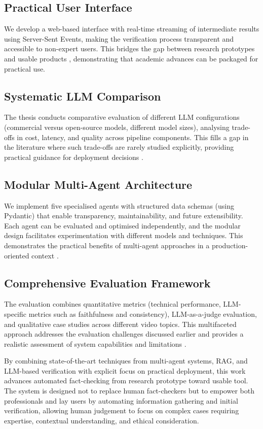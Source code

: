 \documentclass[12pt,a4paper]{article}
\begin{document}
\subsection{Practical User Interface}

We develop a web-based interface with real-time streaming of intermediate results using Server-Sent Events, making the verification process transparent and accessible to non-expert users. This bridges the gap between research prototypes and usable products \citep{lin2025factaudit}, demonstrating that academic advances can be packaged for practical use.

\subsection{Systematic LLM Comparison}

The thesis conducts comparative evaluation of different LLM configurations (commercial versus open-source models, different model sizes), analysing trade-offs in cost, latency, and quality across pipeline components. This fills a gap in the literature where such trade-offs are rarely studied explicitly, providing practical guidance for deployment decisions \citep{raschka2025llmeval}.

\subsection{Modular Multi-Agent Architecture}

We implement five specialised agents with structured data schemas (using Pydantic) that enable transparency, maintainability, and future extensibility. Each agent can be evaluated and optimised independently, and the modular design facilitates experimentation with different models and techniques. This demonstrates the practical benefits of multi-agent approaches in a production-oriented context \citep{hysonlab2025factagent, chen2024local, ma2025guided}.

\subsection{Comprehensive Evaluation Framework}

The evaluation combines quantitative metrics (technical performance, LLM-specific metrics such as faithfulness and consistency), LLM-as-a-judge evaluation, and qualitative case studies across different video topics. This multifaceted approach addresses the evaluation challenges discussed earlier and provides a realistic assessment of system capabilities and limitations \citep{raschka2025llmeval, ruder2025llmeval}.

By combining state-of-the-art techniques from multi-agent systems, RAG, and LLM-based verification with explicit focus on practical deployment, this work advances automated fact-checking from research prototype toward usable tool. The system is designed not to replace human fact-checkers but to empower both professionals and lay users by automating information gathering and initial verification, allowing human judgement to focus on complex cases requiring expertise, contextual understanding, and ethical consideration.



\end{document}
